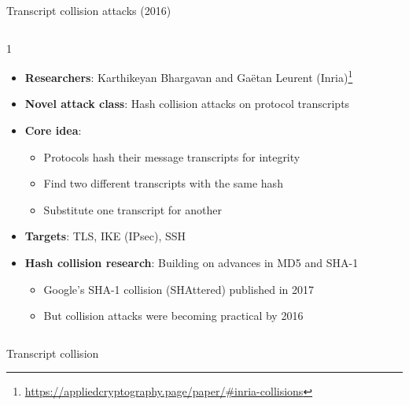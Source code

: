 \ifdefined\PRESENTATION\else\PassOptionsToClass{handout}{beamer}\fi\documentclass[aspectratio=169, lualatex]{beamer}
\begin{document}
\begin{frame}{Transcript collision attacks (2016)}
	\begin{columns}[c]
		\begin{column}{1\textwidth}
			\begin{itemize}
				\item \textbf{Researchers}: Karthikeyan Bhargavan and Ga\"etan Leurent (Inria)\footnote{\url{https://appliedcryptography.page/paper/\#inria-collisions}}
				\item \textbf{Novel attack class}: Hash collision attacks on protocol transcripts
				\item \textbf{Core idea}:
				      \begin{itemize}
					      \item Protocols hash their message transcripts for integrity
					      \item Find two different transcripts with the same hash
					      \item Substitute one transcript for another
				      \end{itemize}
				\item \textbf{Targets}: TLS, IKE (IPsec), SSH
				\item \textbf{Hash collision research}: Building on advances in MD5 and SHA-1
				      \begin{itemize}
					      \item Google's SHA-1 collision (SHAttered) published in 2017
					      \item But collision attacks were becoming practical by 2016
				      \end{itemize}
			\end{itemize}
		\end{column}
	\end{columns}
\end{frame}

\begin{frame}{Transcript collision}
\end{frame}
\end{document}
